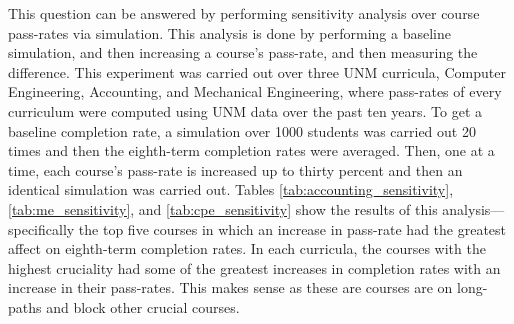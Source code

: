 \documentclass[botnum, fleqn]{unmeethesis}
\begin{document}
      This question can be answered by performing sensitivity analysis over course pass-rates via simulation. This analysis is done by performing a baseline simulation, and then increasing a course's pass-rate, and then measuring the difference. This experiment was carried out over three UNM curricula, Computer Engineering, Accounting, and Mechanical Engineering, where pass-rates of every curriculum were computed using UNM data over the past ten years. To get a baseline completion rate, a simulation over 1000 students was carried out 20 times and then the eighth-term completion rates were averaged. Then, one at a time, each course's pass-rate is increased up to thirty percent and then an identical simulation was carried out. Tables \ref{tab:accounting_sensitivity}, \ref{tab:me_sensitivity}, and \ref{tab:cpe_sensitivity} show the results of this analysis---specifically the top five courses in which an increase in pass-rate had the greatest affect on eighth-term completion rates. In each curricula, the courses with the highest cruciality had some of the greatest increases in completion rates with an increase in their pass-rates. This makes sense as these are courses are on long-paths and block other crucial courses.

\end{document}
